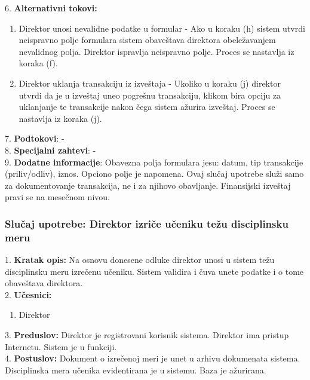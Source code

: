 \documentclass{article}
\begin{document}
6. \textbf{Alternativni tokovi:} 
\begin{enumerate} [label=(\roman*)]
\item Direktor unosi nevalidne podatke u formular - Ako u koraku (h) sistem utvrdi neispravno polje formulara sistem obaveštava direktora obeležavanjem nevalidnog polja. Direktor ispravlja neispravno polje. Proces se nastavlja iz koraka (f).
\item Direktor uklanja transakciju iz izveštaja - Ukoliko u koraku (j) direktor utvrdi da je u izveštaj uneo pogrešnu transakciju, klikom bira opciju za uklanjanje te transakcije nakon čega sistem ažurira izveštaj. Proces se nastavlja iz koraka (j).  
\end{enumerate}

7. \textbf{Podtokovi}:  - \\

8. \textbf{Specijalni zahtevi}: - \\

9. \textbf{Dodatne informacije}: Obavezna polja formulara jesu: datum, tip transakcije (priliv/odliv), iznos. Opciono polje je napomena. Ovaj slučaj upotrebe služi samo za dokumentovanje transakcija, ne i za njihovo obavljanje. Finansijski izveštaj pravi se na mesečnom nivou.  \\


\subsubsection{Slučaj upotrebe: Direktor izriče učeniku težu disciplinsku meru}
1. \textbf{Kratak opis:} Na osnovu donesene odluke direktor unosi u sistem težu disciplinsku meru izrečenu učeniku. Sistem validira i čuva unete podatke i o tome obaveštava direktora. \\

2. \textbf{Učesnici:}
\begin{enumerate} [label=(\alph*)]
\item Direktor
\end{enumerate} 

3. \textbf{Preduslov:} Direktor je registrovani korisnik sistema. Direktor ima pristup Internetu. Sistem je u funkciji. \\

4. \textbf{Postuslov:} Dokument o izrečenoj meri je unet u arhivu dokumenata sistema. Disciplinska mera učenika evidentirana je u sistemu. Baza je ažurirana. \\
\end{document}

